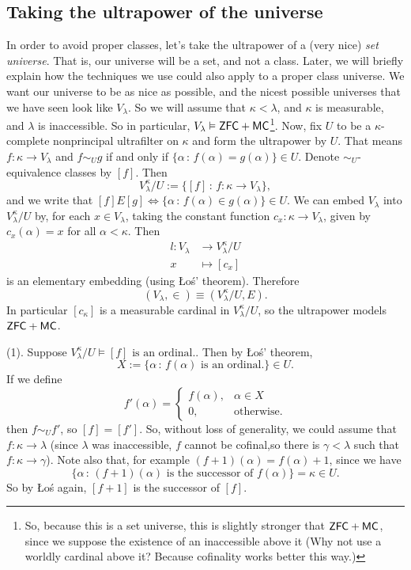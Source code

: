 \documentclass{article}
\begin{document}
\subsection{Taking the ultrapower of the universe}
In order to avoid proper classes, let's take the ultrapower of a (very nice) \textit{set universe}. That is, our universe will be a set, and not a class. Later, we will briefly explain how the techniques we use could also apply to a proper class universe.\gap 
We want our universe to be as nice as possible, and the nicest possible universes that we have seen look like $V_{\lambda}$. So we will assume that $\kappa < \lambda$, and $\kappa$ is measurable, and $\lambda$ is inaccessible. So in particular, $V_{\lambda} \vDash \mathsf{ZFC} + \mathsf{MC}$\footnote{So, because this is a set universe, this is slightly stronger that $\mathsf{ZFC} + \mathsf{MC}$, since we suppose the existence of an inaccessible above it (Why not use a worldly cardinal above it? Because cofinality works better this way.)}. \gap
Now, fix $U$ to be a $\kappa$-complete nonprincipal ultrafilter on $\kappa$ and form the ultrapower by $U$. That means $f : \kappa \to V_{\lambda}$ and $f \sim_{U} g$ if and only if $\{\alpha \, : \, f(\alpha) = g(\alpha)\} \in U$. Denote $\sim_{U}$-equivalence classes by $[f]$. Then \[ V_{\lambda}^{\kappa}/U := \{ [f] \, : \, f : \kappa \to V_{\lambda}\},\] and we write that $[f]E[g] \Leftrightarrow \{ \alpha \, : \, f(\alpha) \in g(\alpha)\} \in U$. \gap 
We can embed $V_{\lambda}$ into $V_{\lambda}^{\kappa}/U$ by, for each $x \in V_{\lambda}$, taking the constant function $c_{x} : \kappa \to V_{\lambda}$, given by $c_{x}(\alpha)=x$ for all $\alpha < \kappa$. Then \begin{align*}
    l : V_{\lambda} &\to V_{\lambda}^{\kappa}/U\\
    x &\mapsto [c_{x}]
\end{align*}
is an elementary embedding (using \L o\'s' theorem). Therefore \[ (V_{\lambda}, \in) \equiv (V_{\lambda}^{\kappa}/U, E). \] In particular $[c_{\kappa}]$ is a measurable cardinal in $V_{\lambda}^{\kappa}/U$, so the ultrapower models $\mathsf{ZFC} + \mathsf{MC}$.
\begin{remark*}(1).
    Suppose $V_{\lambda}^{\kappa}/U \models [f] \text{ is an ordinal.}$. Then by \L o\'s' theorem, \[ X := \{\alpha \, : \, f(\alpha) \text{ is an ordinal.} \} \in U.\]
    If we define \[ f'(\alpha) = \begin{cases}
        f(\alpha), & \alpha \in X\\ 
        0, & \text{otherwise.}
    \end{cases}\]
    then $f \sim_{U} f'$, so $[f]=[f']$. So, without loss of generality, we could assume that $f: \kappa \to \lambda$ (since $\lambda$ was inaccessible, $f$ cannot be cofinal,so there is $\gamma < \lambda$ such that $f : \kappa \to \gamma$). Note also that, for example $(f+1)(\alpha)=f(\alpha)+1$, since we have \[ \{\alpha \, : \, (f+1)(\alpha) \text{ is the successor of }f(\alpha)\} = \kappa \in U.\] So by \L o\'s again, $[f+1]$ is the successor of $[f]$.
\end{remark*}
\end{document}
